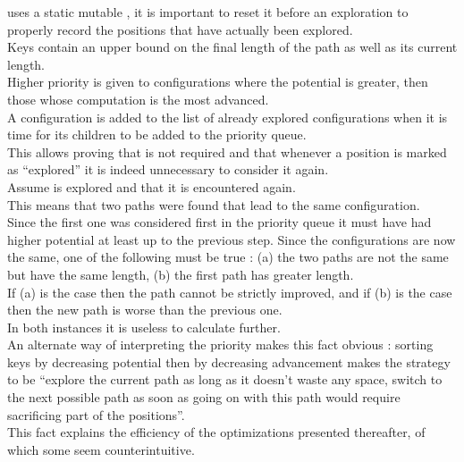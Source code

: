  uses a static mutable , it is important to reset it before
an exploration to properly record the positions that have actually been explored.\\

Keys contain an upper bound on the final length of the path as well as its
current length.\\
Higher priority is given to configurations where the potential is greater, then
those whose computation is the most advanced.\\

A configuration  is added to the list
of already explored configurations when it is time for its children to be added
to the priority queue.\\
This allows proving that  is not required and that whenever a
position is marked as ``explored'' it is indeed unnecessary to consider it again.\\

Assume  is explored and that it is encountered again.\\
This means that two paths were found that lead to the same configuration.\\
Since the first one was considered first in the priority queue it must have
had higher potential at least up to the previous step. Since the configurations
are now the same, one of the following must be true :
(a) the two paths are not the same but have the same length,
(b) the first path has greater length.\\
If (a) is the case then the path cannot be strictly improved, and if (b) is the case
then the new path is worse than the previous one.\\
In both instances it is useless to calculate further.\\

An alternate way of interpreting the priority makes this fact obvious : sorting
keys by decreasing potential then by decreasing advancement makes the strategy to
be ``explore the current path as long as it doesn't waste any space, switch
to the next possible path as soon as going on with this path would require
sacrificing part of the positions''.\\
This fact explains the efficiency of the optimizations presented thereafter, of
which some seem counterintuitive.\\


